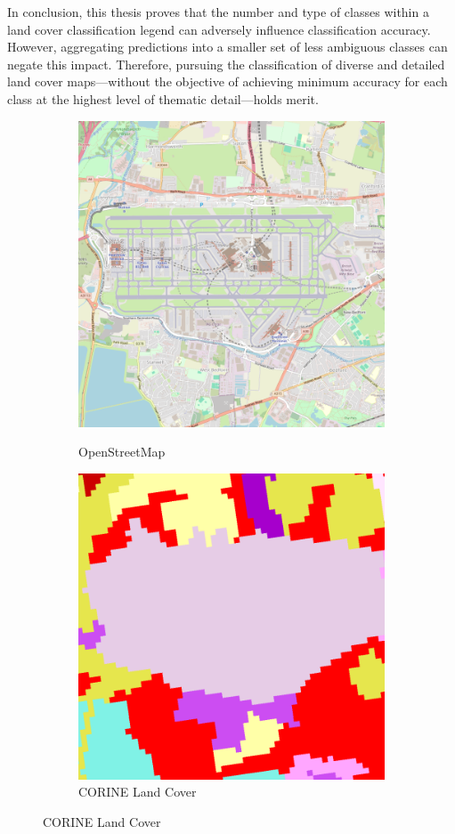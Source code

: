         In conclusion, this thesis proves that the number and type of classes within a land cover classification legend can adversely influence classification accuracy. However, aggregating predictions into a smaller set of less ambiguous classes can negate this impact. Therefore, pursuing the classification of diverse and detailed land cover maps---without the objective of achieving minimum accuracy for each class at the highest level of thematic detail---holds merit.
    
        \begin{figure}[H]
        \centering
        \begin{subfigure}[b]{0.48\textwidth}
        \centering
        \caption{OpenStreetMap}
        \includegraphics[width=\textwidth,height=0.7\textwidth]{figs_06/heathrow_osm.png}
        \label{fig:heathrow_osm}
        \end{subfigure}
        \hfill
        \begin{subfigure}[b]{0.48\textwidth}
        \centering
        \caption{CORINE Land Cover}
        \includegraphics[width=\textwidth,height=0.7\textwidth]{figs_06/heathrow_clc.png}

\end{subfigure}
\end{figure}
